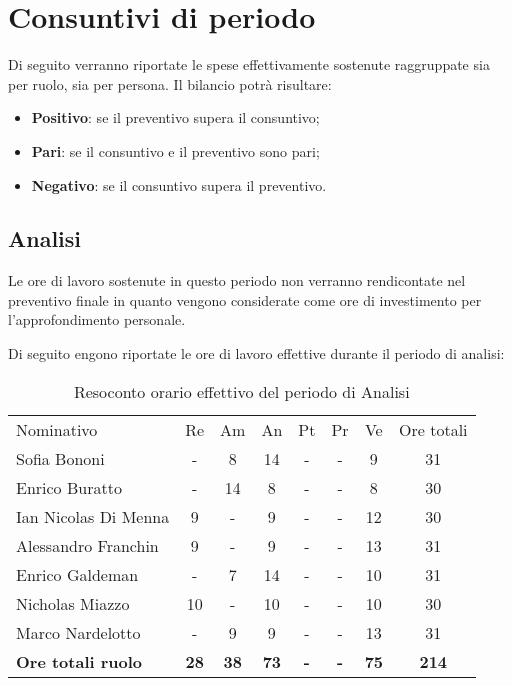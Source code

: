 \documentclass[../piano-di-progetto.tex]{subfiles}
\begin{document}
\section{Consuntivi di periodo}
Di seguito verranno riportate le spese effettivamente sostenute raggruppate sia per ruolo, sia per persona. Il bilancio potrà risultare:

\begin{itemize}
    \item \textbf{Positivo}: se il preventivo supera il consuntivo;
    \item \textbf{Pari}: se il consuntivo e il preventivo sono pari;
    \item \textbf{Negativo}: se il consuntivo supera il preventivo.
\end{itemize}

\subsection{Analisi}
Le ore di lavoro sostenute in questo periodo non verranno rendicontate nel preventivo finale in quanto vengono considerate come ore di investimento per l’approfondimento personale.

Di seguito engono riportate le ore di lavoro effettive durante il periodo di analisi:
\begin{table}[H]
    \centering
    \begin{tabular}{lccccccc}
      Nominativo                & Re         & Am         & An         & Pt         & Pr         & Ve         & Ore totali \\
      Sofia Bononi              & -          & 8          & 14          & -          & -          & 9          & 31          \\
      Enrico Buratto            & -          & 14         & 8          & -          & -          & 8          & 30          \\
      Ian Nicolas Di Menna      & 9          & -          & 9          & -          & -          & 12          & 30          \\
      Alessandro Franchin       & 9          & -          & 9          & -          & -          & 13          & 31         \\
      Enrico Galdeman           & -          & 7          & 14          & -          & -          & 10          & 31          \\
      Nicholas Miazzo           & 10         & -          & 10          & -          & -          & 10         & 30         \\
      Marco Nardelotto          & -          & 9          & 9         & -          & -          & 13          & 31          \\
      \textbf{Ore totali ruolo} & \textbf{28} & \textbf{38} & \textbf{73} & \textbf{-} & \textbf{-} & \textbf{75} & \textbf{214}
    \end{tabular}
    \caption{Resoconto orario effettivo del periodo di Analisi}
  \end{table}
\end{document}
